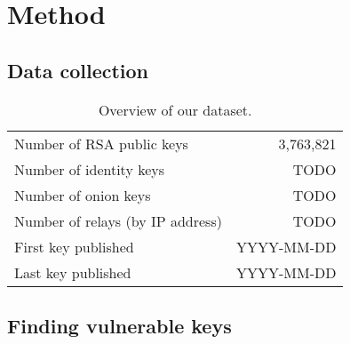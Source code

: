 \section{Method}

\subsection{Data collection}

\begin{table}[t]
	\centering
	\begin{tabular}{l r}
	\toprule
	Number of RSA public keys & 3,763,821 \\
	Number of identity keys & TODO \\
	Number of onion keys & TODO \\
	\midrule
	Number of relays (by IP address) & TODO \\
	First key published & YYYY-MM-DD \\
	Last key published & YYYY-MM-DD \\
	\bottomrule
	\end{tabular}
	\caption{Overview of our dataset.}
	\label{tab:dataset}
\end{table}

\subsection{Finding vulnerable keys}

